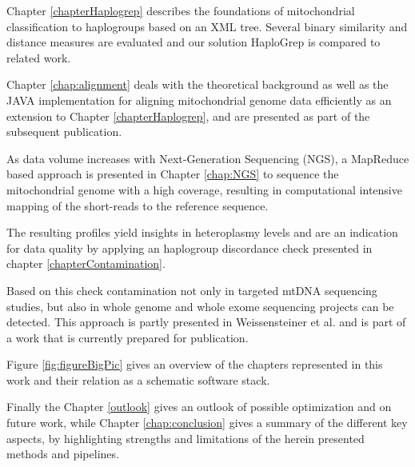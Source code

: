 Chapter \ref{chapterHaplogrep} describes the foundations of mitochondrial classification to haplogroups based on an XML tree. Several binary similarity and distance measures are evaluated and our solution HaploGrep is compared to related work. 


Chapter \ref{chap:alignment} deals with the theoretical background as well as the JAVA implementation for aligning mitochondrial genome data efficiently as an extension to Chapter \ref{chapterHaplogrep}, and are presented as part of the subsequent publication. 

As data volume increases with Next-Generation Sequencing (NGS), a MapReduce based approach is presented in Chapter \ref{chap:NGS} to sequence the mitochondrial genome with a high coverage, resulting in computational intensive mapping of the short-reads to the reference sequence. 

The resulting profiles yield insights in heteroplasmy levels and are an indication for data quality by applying an haplogroup discordance check presented in chapter \ref{chapterContamination}.


Based on this check contamination not only in targeted mtDNA sequencing studies, but also in whole genome and whole exome sequencing projects can be detected. This approach is partly presented in Weissensteiner et al. \cite{Weissensteiner2016b} and is part of a work that is currently prepared for publication.


Figure \ref{fig:figureBigPic} gives an overview of the chapters represented in this work and their relation as a schematic software stack.

 
Finally the Chapter \ref{outlook} gives an outlook of possible optimization and on future work, while Chapter \ref{chap:conclusion} gives a summary of the different key aspects, by highlighting strengths and limitations of the herein presented methods and pipelines.



